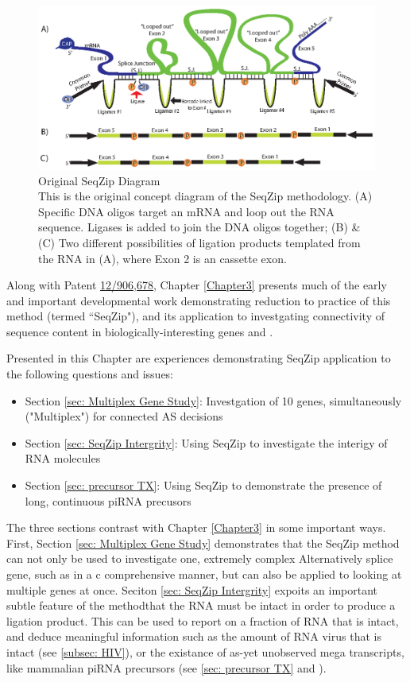 \begin{figure}[htbp]
	\centering 
	\includegraphics{Figures/Chapter2/OriginalSeqZipDiagram.eps}
	\caption[Original SeqZip Diagram]
	{
		Original SeqZip Diagram\\
		This is the original concept diagram of the SeqZip methodology. (A) Specific DNA oligos target an mRNA and loop out the RNA sequence. Ligases is added to join the DNA oligos together; (B) \& (C) Two different possibilities of ligation products templated from the RNA in (A), where Exon 2 is an cassette exon.
	}
	\label{fig:Original SeqZip Diagram}
\end{figure}

Along with Patent \href{http://1.usa.gov/PTG9BB}{12/906,678}, Chapter \ref{Chapter3} presents much of the early and important developmental work demonstrating reduction to practice of this method (termed ``SeqZip"), and its application to investgating connectivity of sequence content in biologically-interesting genes \fn{} and \dscam{}. 

Presented in this Chapter are experiences demonstrating SeqZip application to the following questions and issues:
\begin{itemize}
	\item Section \ref{sec: Multiplex Gene Study}: Investgation of 10 genes, simultaneously ("Multiplex") for connected AS decisions
	\item Section \ref{sec: SeqZip Intergrity}: Using SeqZip to investigate the interigy of RNA molecules
 	\item Section \ref{sec: precursor TX}: Using SeqZip to demonstrate the presence of long, continuous piRNA precusors
\end{itemize}

The three sections contrast with Chapter \ref{Chapter3} in some important ways. First, Section \ref{sec: Multiplex Gene Study} demonstrates that the SeqZip method can not only be used to investigate one, extremely complex Alternatively splice gene, such as \dscam{} in a c comprehensive manner, but can also be applied to looking at multiple genes at once. Seciton \ref{sec: SeqZip Intergrity} expoits an important subtle feature of the method\textemdash that the RNA must be intact in order to produce a ligation product. This can be used to report on a fraction of RNA that is intact, and deduce meaningful information such as the amount of RNA virus that is intact (see \ref{subsec: HIV}), or the existance of as-yet unobserved mega transcripts, like mammalian piRNA precursors (see \ref{sec: precursor TX} and \citep{Li2013h,Li2013}).

